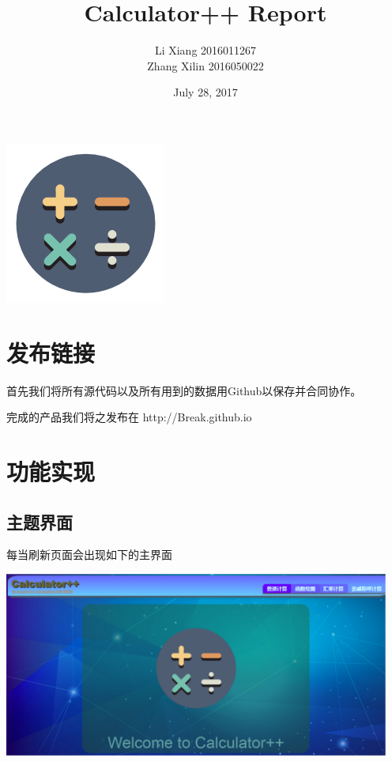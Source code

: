 \documentclass[hyperref,UTF8]{ctexart}
\begin{document}
\title{Calculator++ Report}
\author{Li Xiang 2016011267 \\ Zhang Xilin 2016050022}
\date{July 28, 2017}
\maketitle

\vspace {2cm}
\begin{center}
\includegraphics{icon.png}
\end{center}

\newpage

\tableofcontents

\newpage

\section{发布链接}

首先我们将所有源代码以及所有用到的数据用Github以保存并合同协作。

完成的产品我们将之发布在 http://Break.github.io

\newpage

\section{功能实现}

\subsection{主题界面}
每当刷新页面会出现如下的主界面
\begin{center}
\includegraphics[width=5in]{theme.PNG}
\end{center}
\end{document}
